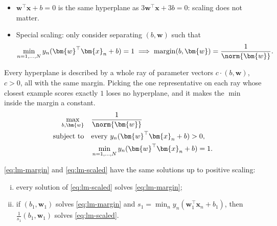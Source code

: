 \begin{itemize}
    \item \(\bm{w}^\top \bm{x} + b = 0\) is the same hyperplane as
        \(3\bm{w}^\top \bm{x} + 3b = 0\): scaling does not matter.
    \item Special scaling: only consider separating \((b, \bm{w})\) such
        that
        \[
            \min_{n=1,\dots,N} y_n (\bm{w}^\top \bm{x}_n + b) = 1
            \implies \operatorname{margin}(b, \bm{w}) =
            \frac{1}{\norm{\bm{w}}}.
        \]
\end{itemize}
Every hyperplane is described by a whole ray of parameter vectors \(c \cdot
(b, \bm{w})\), \(c > 0\), all with the same margin. Picking the one
representative on each ray whose closest example scores exactly \(1\)
loses no hyperplane, and it makes the \(\min\) inside the margin a constant.
\begin{equation}\label{eq:lm-scaled}
    \begin{aligned}
        \max_{b, \bm{w}} \quad & \frac{1}{\norm{\bm{w}}}\\
        \text{subject to} \quad & \text{every } y_n (\bm{w}^\top \bm{x}_n +
            b) > 0,\\
        & \min_{n=1,\dots,N} y_n (\bm{w}^\top \bm{x}_n + b) = 1.
    \end{aligned}
\end{equation}

\begin{lemma}\label{lem:special-scaling}
    \eqref{eq:lm-margin} and \eqref{eq:lm-scaled} have the same solutions
    up to positive scaling:
    \begin{enumerate}[(i)]
        \item every solution of \eqref{eq:lm-scaled} solves
            \eqref{eq:lm-margin};
        \item if \((b_1, \bm{w}_1)\) solves \eqref{eq:lm-margin} and \(s_1 =
            \min_n y_n (\bm{w}_1^\top \bm{x}_n + b_1)\), then \(\frac{1}{s_1}
            (b_1, \bm{w}_1)\) solves \eqref{eq:lm-scaled}.
    \end{enumerate}
\end{lemma}

